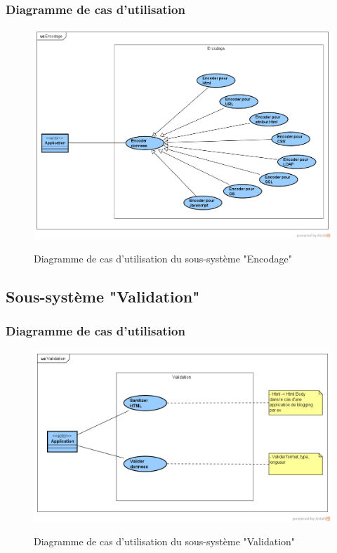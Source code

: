 \subsubsection{Diagramme de cas d'utilisation}
\begin{figure}[H]
	\centering
	\begin{minipage}{12cm}
		\centering
		{\includegraphics[height=0.35\textheight, width=1\textwidth]{fig/Encodage-use-case-diagram.png}}
	\end{minipage}
	\caption{Diagramme de cas d'utilisation du sous-système "Encodage"}
	\label{fig:7.15}
\end{figure}

\subsection{Sous-système "Validation"}
\subsubsection{Diagramme de cas d'utilisation}
\begin{figure}[H]
	\centering
	\begin{minipage}{12cm}
		\centering
		{\includegraphics[height=0.35\textheight, width=1\textwidth]{fig/Validation-use-case-diagram.png}}
	\end{minipage}
	\caption{Diagramme de cas d'utilisation du sous-système "Validation"}
	\label{fig:7.16}
\end{figure}

